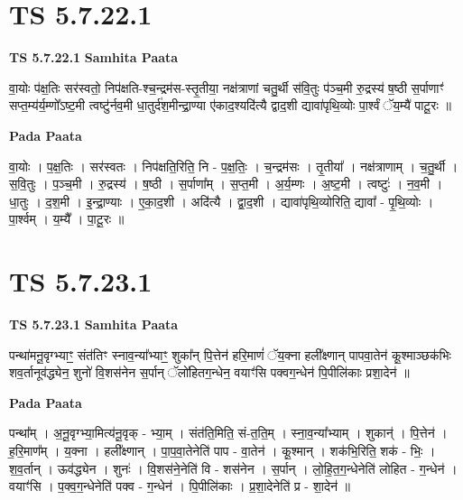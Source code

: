 \documentclass[17pt]{extarticle}
\begin{document}
\section*{ TS 5.7.22.1 }

\textbf{TS 5.7.22.1 } \newline
\textbf{Samhita Paata} \newline

वा॒योः प॑क्ष॒तिः सर॑स्वतो॒ निप॑क्षति-श्च॒न्द्रम॑स-स्तृ॒तीया॒ नक्ष॑त्राणां चतु॒र्थी स॑वि॒तुः प॑ञ्च॒मी रु॒द्रस्य॑ ष॒ष्ठी स॒र्पाणाꣳ॑ सप्त॒म्य॑र्य॒म्णो᳚ऽष्ट॒मी त्वष्टु॑र्नव॒मी धा॒तुर्द॑श॒मीन्द्रा॒ण्या ए॑काद॒श्यदि॑त्यै द्वाद॒शी द्यावा॑पृथि॒व्योः पा॒र्श्वं ॅय॒म्यै॑ पाटू॒रः ॥ \newline

\textbf{Pada Paata} \newline

वा॒योः । प॒क्ष॒तिः । सर॑स्वतः । निप॑क्षति॒रिति॒ नि - प॒क्ष॒तिः॒ । च॒न्द्रम॑सः । तृ॒तीया᳚ । नक्ष॑त्राणाम् । च॒तु॒र्थी । स॒वि॒तुः । प॒ञ्च॒मी । रु॒द्रस्य॑ । ष॒ष्ठी । स॒र्पाणा᳚म् । स॒प्त॒मी । अ॒र्य॒म्णः । अ॒ष्ट॒मी । त्वष्टुः॑ । न॒व॒मी । धा॒तुः । द॒श॒मी । इ॒न्द्रा॒ण्याः । ए॒का॒द॒शी । अदि॑त्यै । द्वा॒द॒शी । द्यावा॑पृथि॒व्योरिति॒ द्यावा᳚ - पृ॒थि॒व्योः । पा॒र्श्वम् । य॒म्यै᳚ । पा॒टू॒रः ॥  \newline




\section*{ TS 5.7.23.1 }

\textbf{TS 5.7.23.1 } \newline
\textbf{Samhita Paata} \newline

पन्था॑मनू॒वृग्भ्याꣳ॒॒ संत॑तिꣳ स्नाव॒न्या᳚भ्याꣳ॒॒ शुका᳚न् पि॒त्तेन॑ हरि॒माणं॑ ॅय॒क्ना हली᳚क्ष्णान् पापवा॒तेन॑ कू॒श्माञ्छक॑भिः शव॒र्तानूव॑द्ध्येन॒ शुनो॑ वि॒शस॑नेन स॒र्पान् ॅलो॑हितग॒न्धेन॒ वयाꣳ॑सि पक्वग॒न्धेन॑ पि॒पीलि॑काः प्रशा॒देन॑ ॥ \newline

\textbf{Pada Paata} \newline

पन्था᳚म् । अ॒नू॒वृग्भ्या॒मित्य॑नू॒वृक् - भ्या॒म् । संत॑ति॒मिति॒ सं-त॒ति॒म् । स्ना॒व॒न्या᳚भ्याम् । शुकान्॑ । पि॒त्तेन॑ । ह॒रि॒माण᳚म् । य॒क्ना । हली᳚क्ष्णान् । पा॒प॒वा॒तेनेति॑ पाप - वा॒तेन॑ । कू॒श्मान् । शक॑भि॒रिति॒ शक॑ - भिः॒ । श॒व॒र्तान् । ऊव॑द्ध्येन । शुनः॑ । वि॒शस॑ने॒नेति॑ वि - शस॑नेन । स॒र्पान् । लो॒हि॒त॒ग॒न्धेनेति॑ लोहित - ग॒न्धेन॑ । वयाꣳ॑सि । प॒क्व॒ग॒न्धेनेति॑ पक्व - ग॒न्धेन॑ । पि॒पीलि॑काः । प्र॒शा॒देनेति॑ प्र - शा॒देन॑ ॥  \newline
\end{document}
